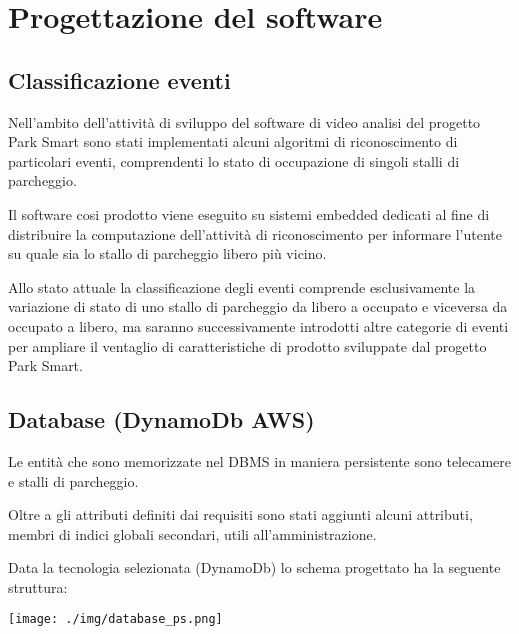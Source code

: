 \chapter{Progettazione del software}


\section{Classificazione eventi}
Nell'ambito dell'attività di sviluppo del software di video analisi del progetto Park Smart sono stati implementati alcuni algoritmi di riconoscimento di particolari eventi, comprendenti lo stato di occupazione di singoli stalli di parcheggio. 
\newline

Il software cosi prodotto viene eseguito su sistemi embedded dedicati al fine di distribuire la computazione dell'attività di riconoscimento per informare l'utente su quale sia lo stallo di parcheggio libero più vicino. 
\newline

Allo stato attuale la classificazione degli eventi comprende esclusivamente la variazione di stato di uno stallo di parcheggio da libero a occupato e viceversa da occupato a libero, ma saranno successivamente introdotti altre categorie di eventi per ampliare il ventaglio di caratteristiche di prodotto sviluppate dal progetto Park Smart.
\newline

\vspace{2.5truecm}

\section{Database (DynamoDb AWS)}
Le entità che sono memorizzate nel DBMS in maniera persistente sono telecamere e stalli di parcheggio. 
\newline

Oltre a gli attributi definiti dai requisiti sono stati aggiunti alcuni attributi, membri di indici globali secondari, utili all'amministrazione. 
\newline

Data la tecnologia selezionata (DynamoDb) lo schema progettato ha la seguente struttura:
\newline

\vspace{1.2truecm}

\centerline{\texttt{[image: ./img/database\_ps.png]}}


